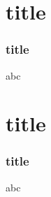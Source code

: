 \documentclass{beamer}
\begin{document}
	
\section{title}
\begin{frame}
\frametitle{title}
	abc
\end{frame}	

\section{title}
\begin{frame}
\frametitle{title}
	abc
\end{frame}	
	
\end{document}
